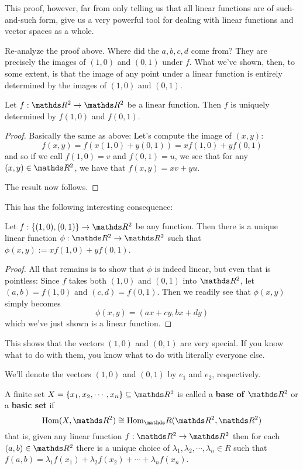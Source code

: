 This proof, however, far from only telling us that all linear functions are of such-and-such form, give us a very powerful tool for dealing with linear functions and vector spaces as a whole.

Re-analyze the proof above. Where did the $a,b,c,d$ come from? They are precisely the images of $(1,0)$ and $(0,1)$ under $f$. What we've shown, then, to some extent, is that the image of any point under a linear function is entirely determined by the images of $(1,0)$ and $(0,1)$.

\begin{theorem}
	Let $f:\R^2\to\R^2$ be a linear function. Then $f$ is uniquely determined by $f(1,0)$ and $f(0,1)$.
\end{theorem}
\begin{proof}
	Basically the same as above: Let's compute the image of $(x,y)$:
	\[f(x,y)=f(x(1,0)+y(0,1))=xf(1,0)+yf(0,1)\]and so if we call $f(1,0)=v$ and $f(0,1)=u$, we see that for any $(x,y)\in\R^2$, we have that $f(x,y)=xv+yu$.
	
	The result now follows.
\end{proof}

This has the following interesting consequence:
\begin{cor}
	Let $f:\{(1,0),(0,1)\}\to\R^2$ be any function. Then there is a unique linear function $\phi:\R^2\to\R^2$ such that $\phi(x,y):=xf(1,0)+yf(0,1)$.
\end{cor}
\begin{proof}
	All that remains is to show that $\phi$ is indeed linear, but even that is pointless: Since $f$ takes both $(1,0)$ and $(0,1)$ into $\R^2$, let $(a,b)=f(1,0)$ and $(c,d)=f(0,1)$. Then we readily see that $\phi(x,y)$ simply becomes
	\[\phi(x,y)=(ax+cy,bx+dy)\]which we've just shown is a linear function.
\end{proof}

This shows that the vectors $(1,0)$ and $(0,1)$ are very special. If you know what to do with them, you know what to do with literally everyone else.

\begin{df}
	We'll denote the vectors $(1,0)$ and $(0,1)$ by $e_1$ and $e_2$, respectively.
\end{df}

\begin{df}
	A finite set $X=\{x_1,x_2,\cdots, x_n\}\subseteq \R^2$ is called a \textbf{base of $\R^2$} or a \textbf{basic set} if $$\hom(X,\R^2)\iso\hom_\R(\R^2,\R^2)$$ that is, given any linear function $f:\R^2\to\R^2$ then for each $(a,b)\in \R^2$ there is a unique choice of $\lambda_1,\lambda_2,\cdots,\lambda_n\in R$ such that $f(a,b)=\lambda_1f(x_1)+\lambda_2f(x_2)+\cdots+\lambda_n f(x_n)$.
\end{df}

